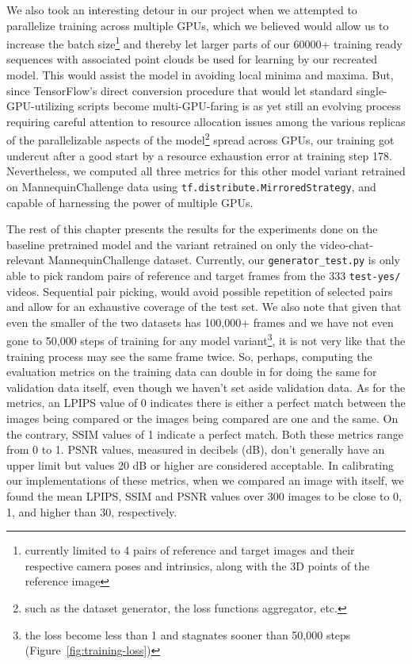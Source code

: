 We also took an interesting detour in our project when we attempted to parallelize training across multiple GPUs, which we believed would allow us to increase the batch size\footnote{currently limited to 4 pairs of reference and target images and their respective camera poses and intrinsics, along with the 3D points of the reference image} and thereby let larger parts of our 60000+ training ready sequences with associated point clouds be used for learning by our recreated model. This would assist the model in avoiding local minima and maxima. But, since TensorFlow's direct conversion procedure that would let standard single-GPU-utilizing scripts become multi-GPU-faring is as yet still an evolving process requiring careful attention to resource allocation issues among the various replicas of the parallelizable aspects of the model\footnote{such as the dataset generator, the loss functions aggregator, etc.} spread across GPUs, our training got undercut after a good start by a resource exhaustion error at training step 178. Nevertheless, we computed all three metrics for this other model variant retrained on MannequinChallenge data using \texttt{tf.distribute.MirroredStrategy}, and capable of harnessing the power of multiple GPUs.

The rest of this chapter presents the results for the experiments done on the baseline pretrained model and the variant retrained on only the video-chat-relevant MannequinChallenge dataset. Currently, our \texttt{generator\_test.py} is only able to pick random pairs of reference and target frames from the 333 \texttt{test-yes/} videos. Sequential pair picking, would avoid possible repetition of selected pairs and allow for an exhaustive coverage of the test set. We also note that given that even the smaller of the two datasets has 100,000+ frames and we have not even gone to 50,000 steps of training for any model variant\footnote{the loss become less than 1 and stagnates sooner than 50,000 steps (Figure~\ref{fig:training-loss})}, it is not very like that the training process may see the same frame twice. So, perhaps, computing the evaluation metrics on the training data can double in for doing the same for validation data itself, even though we haven't set aside validation data. As for the metrics, an LPIPS value of 0 indicates there is either a perfect match between the images being compared or the images being compared are one and the same. On the contrary, SSIM values of 1 indicate a perfect match. Both these metrics range from 0 to 1. PSNR values, measured in decibels (dB), don't generally have an upper limit but values 20 dB or higher are considered acceptable. In calibrating our implementations of these metrics, when we compared an image with itself, we found the mean LPIPS, SSIM and PSNR values over 300 images to be close to 0, 1, and higher than 30, respectively.

